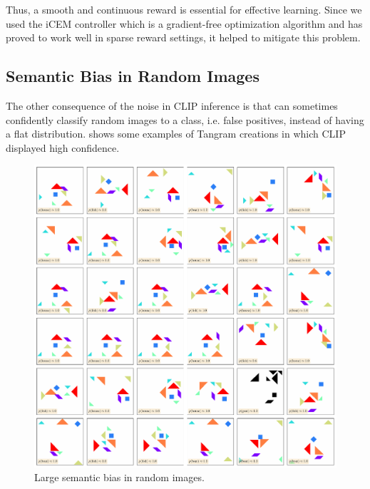 
Thus, a smooth and continuous reward is essential for effective learning.
Since we used the iCEM controller which is a gradient-free optimization algorithm and has proved to work well in sparse reward settings, it helped to mitigate this problem.

\subsection{Semantic Bias in Random Images} %
\label{sec:inference-noise}
The other consequence of the noise in CLIP inference is that can sometimes confidently classify random images to a class, i.e. false positives, instead of having a flat distribution.
 shows some examples of Tangram creations in which CLIP displayed high confidence.

\begin{figure}[h]
    \centering
    \includegraphics[width=\textwidth]{images/adversarial_samples.pdf}
    \caption{Large semantic bias in random images.}
    \label{fig:semantic-bias-random}
\end{figure}

